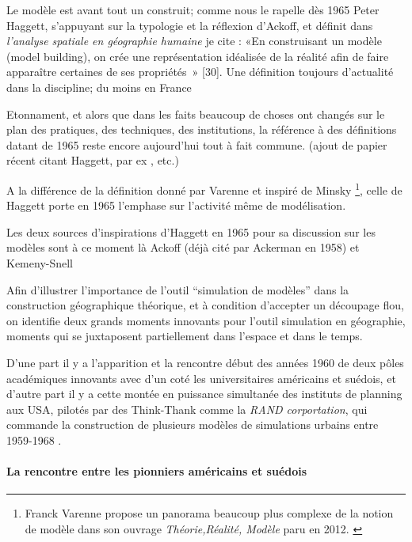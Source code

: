 {%

Le modèle est avant tout un construit; comme nous le rapelle dès 1965 Peter Haggett, s'appuyant sur la typologie et la réflexion d'Ackoff, et définit dans \textit{l'analyse spatiale en géographie humaine} je cite : «En construisant un modèle (model building), on crée une représentation idéalisée de la réalité afin de faire apparaître certaines de ses propriétés » [30]\autocite{Haggett1965}. Une définition toujours d'actualité dans la discipline; du moins en France \autocite{Brunet2000} \autocite[295]{Bailly1995} \autocite{Dastes2001}

Etonnament, et alors que dans les faits beaucoup de choses ont changés sur le plan des pratiques, des techniques, des institutions, la référence à des définitions datant de 1965 reste encore aujourd'hui tout à fait commune. (ajout de papier récent citant Haggett, par ex \autocite{Antony2013}, \autocite{Dastes2001} etc.)

A la différence de la définition donné par Varenne et inspiré de Minsky \footnote{Franck Varenne propose un panorama beaucoup plus complexe de la notion de modèle dans son ouvrage \textit{Théorie,Réalité, Modèle} paru en 2012. \autocite{Varenne2012}}, celle de Haggett porte en 1965 l'emphase sur l'activité même de modélisation. 

Les deux sources d'inspirations d'Haggett \autocite[106]{Berry1963} en 1965 pour sa discussion sur les modèles sont à ce moment là Ackoff \autocite{Ackoff1962} (déjà cité par Ackerman en 1958) et Kemeny-Snell \autocite{Kemeny1962}

Afin d'illustrer l'importance de l'outil \enquote{simulation de modèles} dans la construction géographique théorique, et à condition d'accepter un découpage flou, on identifie deux grands moments innovants pour l'outil simulation en géographie, moments qui se juxtaposent partiellement dans l'espace et dans le temps.

D'une part il y a l'apparition et la rencontre début des années 1960 de deux pôles académiques innovants avec d'un coté les universitaires américains et suédois, et d'autre part il y a cette montée en puissance simultanée des instituts de planning aux USA, pilotés par des Think-Thank comme la \textit{RAND corportation}, qui commande la construction de plusieurs modèles de simulations urbains entre 1959-1968 \autocite[307]{Batty1976}. 

\paragraph{La rencontre entre les pionniers américains et suédois}

}

